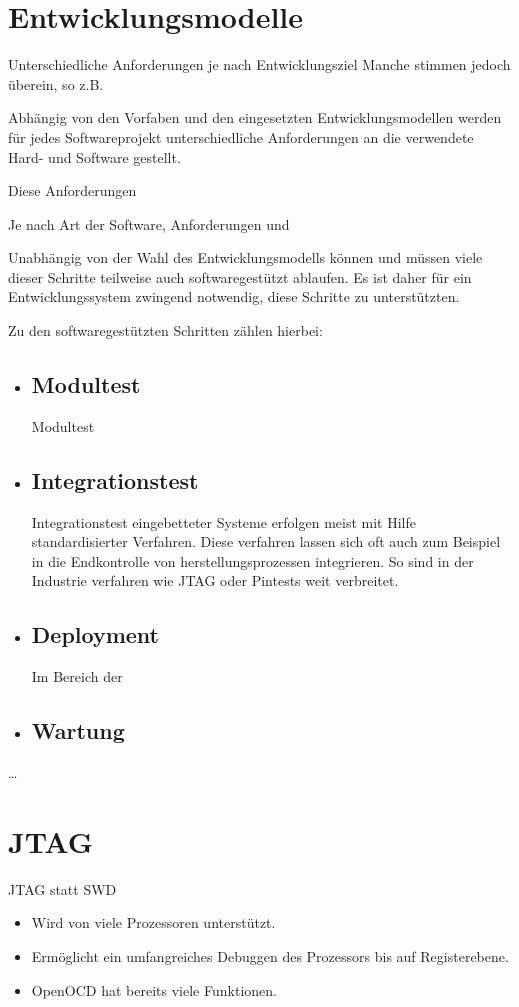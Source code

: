 \section{Entwicklungsmodelle}
Unterschiedliche Anforderungen je nach Entwicklungsziel
Manche stimmen jedoch überein, so z.B.
  



Abhängig von den Vorfaben und den eingesetzten Entwicklungsmodellen werden
für jedes Softwareprojekt unterschiedliche Anforderungen an die verwendete Hard-
und Software gestellt.

Diese Anforderungen 

 Je nach Art der Software, Anforderungen und

Unabhängig von der Wahl des Entwicklungsmodells können und
müssen viele dieser Schritte teilweise auch softwaregestützt ablaufen. Es ist
daher für ein Entwicklungssystem zwingend notwendig, diese Schritte zu
unterstützten.

Zu den softwaregestützten Schritten zählen hierbei:
\begin{itemize}
  \item \subsection*{Modultest} Modultest
  \item \subsection*{Integrationstest} Integrationstest eingebetteter Systeme
  erfolgen meist mit Hilfe standardisierter Verfahren. Diese verfahren lassen
  sich oft auch zum Beispiel in die Endkontrolle von herstellungsprozessen
  integrieren. So sind in der Industrie verfahren wie JTAG oder Pintests weit
  verbreitet.
  \item \subsection*{Deployment} Im Bereich der 
  \item \subsection*{Wartung}
\end{itemize}

\ldots
\section{JTAG}
JTAG statt SWD
\begin{itemize}
  \item Wird von viele Prozessoren unterstützt.
  \item Ermöglicht ein umfangreiches Debuggen des Prozessors bis auf
		Registerebene.
  \item OpenOCD hat bereits viele Funktionen.
\end{itemize}
